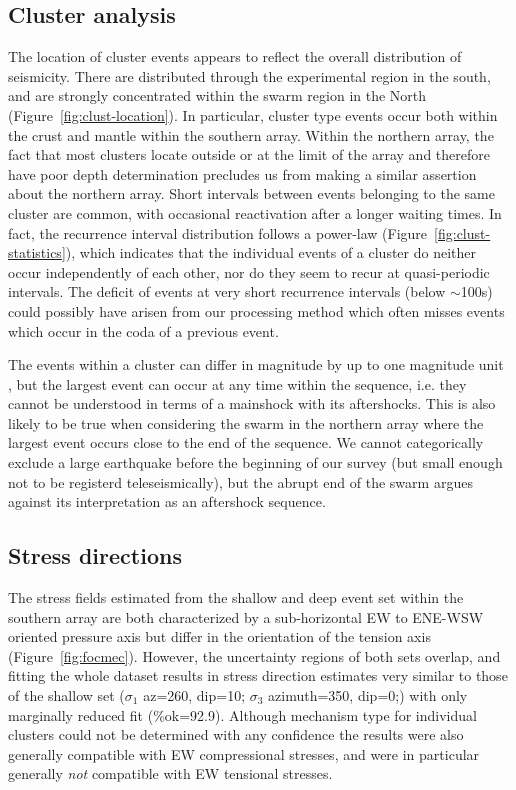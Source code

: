 \documentclass[reviewcopy]{elsarticle}
\begin{document}
\subsection{Cluster analysis}

The location of cluster events appears to reflect the overall
distribution of seismicity.  There are distributed through the
experimental region in the south, and are strongly concentrated within
the swarm region in the North (Figure~\ref{fig:clust-location}).  In
particular, cluster type events occur both within the crust and mantle
within the southern array.  Within the northern array, the fact that
most clusters locate outside or at the limit of the array and therefore
have poor depth determination precludes us from making a similar
assertion about the northern array.   Short intervals between events
belonging to the same cluster are common, with occasional reactivation
after a longer waiting times.  In fact, the recurrence interval
distribution follows a power-law (Figure~\ref{fig:clust-statistics}),
which indicates that the individual events of a cluster do neither occur
independently of each other, nor do they seem to recur at
quasi-periodic intervals.  The deficit of events at very short
recurrence intervals (below $\sim$100s) could possibly have arisen from our
processing method which often  misses events which occur in the
coda of a previous event.

The events within a cluster can differ in
magnitude by up to one magnitude unit , but the
largest event can occur at any time within the sequence, i.e. they
cannot be understood in terms of a mainshock with its aftershocks.
This is also likely to be true when considering the swarm in the
northern array where the largest event occurs close to the end of the
sequence.  We cannot categorically exclude a large earthquake before
the beginning of our survey (but small enough not to be registerd
teleseismically), but the abrupt end of the swarm argues against its
interpretation as an aftershock sequence.

\subsection{Stress directions}

The stress fields estimated from the shallow and deep event set within
the southern array are both characterized by a sub-horizontal EW to
ENE-WSW oriented pressure axis but differ in the orientation of the
tension axis (Figure~\ref{fig:focmec}). However, the uncertainty
regions of both sets overlap, and fitting the whole dataset results in
stress direction estimates very similar to those of the shallow set
($\sigma_1$ az=260\dg, dip=10\dg; $\sigma_3$ azimuth=350\dg, dip=0\dg;) with only marginally reduced fit
(\%ok=92.9).  Although  mechanism type for individual clusters
could not be determined with any confidence the results were
also generally compatible with EW compressional stresses, and were in
particular generally {\em not} compatible with EW tensional stresses.
\end{document}
